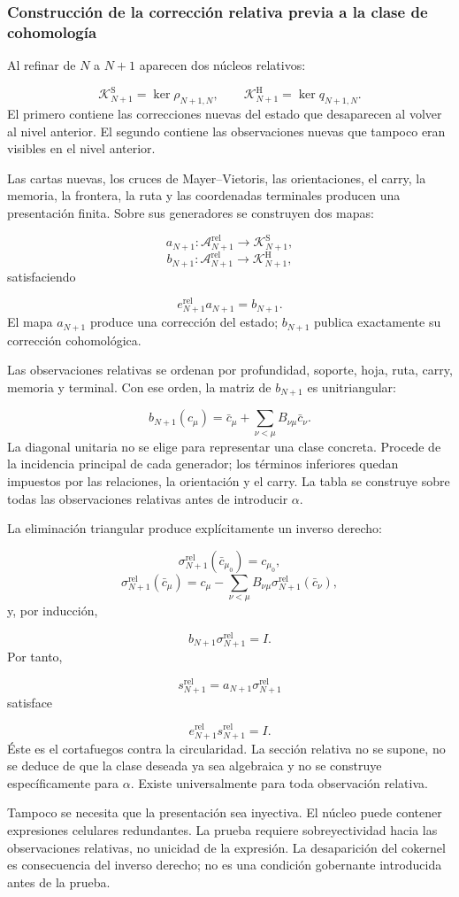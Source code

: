 \subsubsection{Construcción de la corrección relativa previa a la clase de cohomología}
Al refinar de \(N\) a \(N+1\) aparecen dos núcleos relativos:\par
\[
\mathscr K_{N+1}^{\mathrm S}
=
\ker\rho_{N+1,N},
\qquad
\mathscr K_{N+1}^{\mathrm H}
=
\ker q_{N+1,N}.
\]
El primero contiene las correcciones nuevas del estado que desaparecen al volver al nivel anterior. El segundo contiene las observaciones nuevas que tampoco eran visibles en el nivel anterior.\par
Las cartas nuevas, los cruces de Mayer–Vietoris, las orientaciones, el carry, la memoria, la frontera, la ruta y las coordenadas terminales producen una presentación finita. Sobre sus generadores se construyen dos mapas:\par
\[
a_{N+1}:
\mathscr A_{N+1}^{\mathrm{rel}}
\longrightarrow
\mathscr K_{N+1}^{\mathrm S},
\]
\[
b_{N+1}:
\mathscr A_{N+1}^{\mathrm{rel}}
\longrightarrow
\mathscr K_{N+1}^{\mathrm H},
\]
satisfaciendo\par
\[
e_{N+1}^{\mathrm{rel}}a_{N+1}=b_{N+1}.
\]
El mapa \(a_{N+1}\) produce una corrección del estado; \(b_{N+1}\) publica exactamente su corrección cohomológica.\par
Las observaciones relativas se ordenan por profundidad, soporte, hoja, ruta, carry, memoria y terminal. Con ese orden, la matriz de \(b_{N+1}\) es unitriangular:\par
\[
b_{N+1}(c_\mu)
=
\bar c_\mu+
\sum_{\nu<\mu}
B_{\nu\mu}\bar c_\nu.
\]
La diagonal unitaria no se elige para representar una clase concreta. Procede de la incidencia principal de cada generador; los términos inferiores quedan impuestos por las relaciones, la orientación y el carry. La tabla se construye sobre todas las observaciones relativas antes de introducir \(\alpha\).\par
La eliminación triangular produce explícitamente un inverso derecho:\par
\[
\sigma_{N+1}^{\mathrm{rel}}(\bar c_{\mu_0})=c_{\mu_0},
\]
\[
\sigma_{N+1}^{\mathrm{rel}}(\bar c_\mu)
=
c_\mu-
\sum_{\nu<\mu}
B_{\nu\mu}
\sigma_{N+1}^{\mathrm{rel}}(\bar c_\nu),
\]
y, por inducción,\par
\[
b_{N+1}\sigma_{N+1}^{\mathrm{rel}}=I.
\]
Por tanto,\par
\[
s_{N+1}^{\mathrm{rel}}
=
a_{N+1}\sigma_{N+1}^{\mathrm{rel}}
\]
satisface\par
\[
e_{N+1}^{\mathrm{rel}}
s_{N+1}^{\mathrm{rel}}
=I.
\]
Éste es el cortafuegos contra la circularidad. La sección relativa no se supone, no se deduce de que la clase deseada ya sea algebraica y no se construye específicamente para \(\alpha\). Existe universalmente para toda observación relativa.\par
Tampoco se necesita que la presentación sea inyectiva. El núcleo puede contener expresiones celulares redundantes. La prueba requiere sobreyectividad hacia las observaciones relativas, no unicidad de la expresión. La desaparición del cokernel es consecuencia del inverso derecho; no es una condición gobernante introducida antes de la prueba.\par
{}
